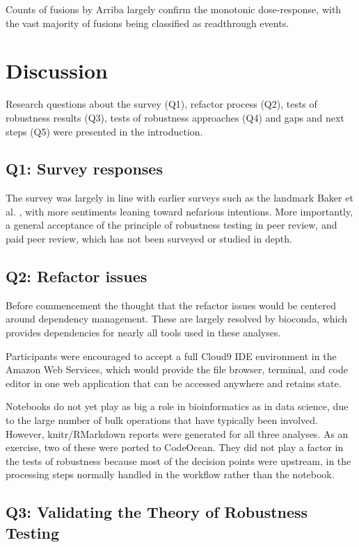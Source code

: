 \documentclass{drexelthesis}
\begin{document}
Counts of fusions by Arriba largely confirm the monotonic dose-response, with the vast majority of fusions being classified as readthrough events.


\section{Discussion}

Research questions about the survey (Q1), refactor process (Q2), tests of robustness results (Q3), tests of robustness approaches (Q4) and gaps and next steps (Q5) were presented in the introduction.

\subsection{Q1: Survey responses}

The survey was largely in line with earlier surveys such as the landmark Baker et al. \cite{Baker2016-ri}, with more sentiments leaning toward nefarious intentions. More importantly, a general acceptance of the principle of robustness testing in peer review, and paid peer review, which has not been surveyed or studied in depth. 

\subsection{Q2: Refactor issues}

Before commencement the thought that the refactor issues would be centered around dependency management. These are largely resolved by bioconda, which provides dependencies for nearly all tools used in these analyses.

Participants were encouraged to accept a full Cloud9 IDE environment in the Amazon Web Services, which would provide the file browser, terminal, and code editor in one web application that can be accessed anywhere and retains state.

Notebooks do not yet play as big a role in bioinformatics as in data science, due to the large number of bulk operations that have typically been involved. However, knitr/RMarkdown reports were generated for all three analyses. As an exercise, two of these were ported to CodeOcean. They did not play a factor in the tests of robustness because most of the decision points were upstream, in the processing steps normally handled in the workflow rather than the notebook.

\subsection{Q3: Validating the Theory of Robustness Testing}
\end{document}
